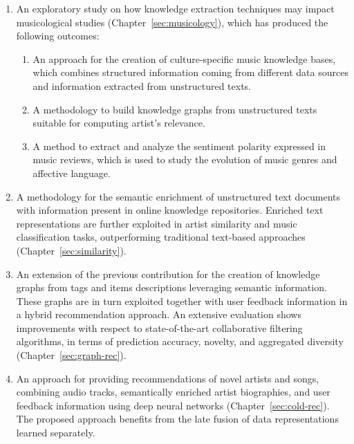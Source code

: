 \begin{enumerate}
\item 
An exploratory study on how knowledge extraction techniques may impact musicological studies (Chapter~\ref{sec:musicology}), which has produced the following outcomes:
\begin{enumerate}
\item 
An approach for the creation of culture-specific music knowledge bases, which combines structured information coming from different data sources and information extracted from unstructured texts. 
\item
A methodology to build knowledge graphs from unstructured texts suitable for computing artist's relevance.
\item 
A method to extract and analyze the sentiment polarity expressed in music reviews, which is used to study the evolution of music genres and affective language.
\end{enumerate}

\item 
A methodology for the semantic enrichment of unstructured text documents with information present in online knowledge repositories. Enriched text representations are further exploited in artist similarity and music classification tasks, outperforming traditional text-based approaches (Chapter~\ref{sec:similarity}).

\item
An extension of the previous contribution for the creation of knowledge graphs from tags and items descriptions leveraging semantic information. These graphs are in turn exploited together with user feedback information in a hybrid recommendation approach. An extensive evaluation shows improvements with respect to state-of-the-art collaborative filtering algorithms, in terms of prediction accuracy, novelty, and aggregated diversity (Chapter~\ref{sec:graph-rec}).%

\item 
An approach for providing recommendations of novel artists and songs, combining audio tracks, semantically enriched artist biographies, and user feedback information using deep neural networks (Chapter~\ref{sec:cold-rec}). The proposed approach benefits from the late fusion of data representations learned separately. %


\end{enumerate}
